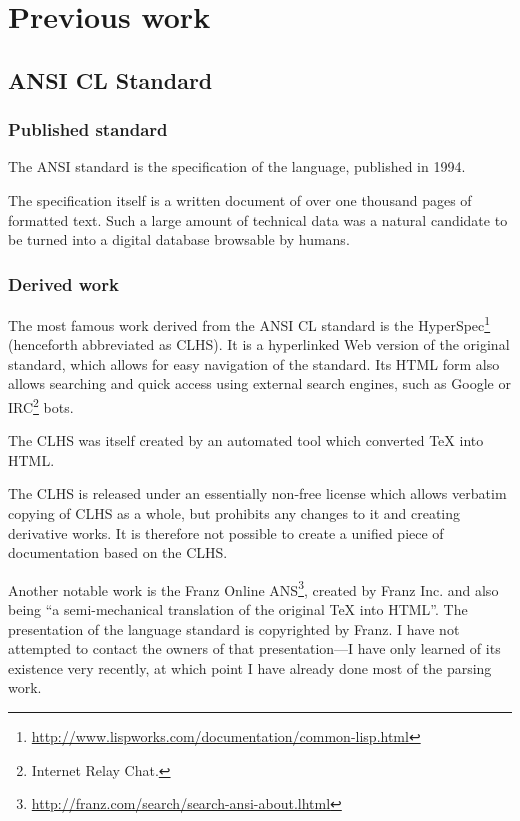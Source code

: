 \section{Previous work}

\subsection{ANSI CL Standard}

\subsubsection{Published standard}

The ANSI \cl{} standard\cite{ANSI:1994:standard} is the specification of the \cl{} language, published in 1994.

The specification itself is a written document of over one thousand pages of formatted text. Such a large amount of technical data was a natural candidate to be turned into a digital database browsable by humans.
\subsubsection{Derived work}
The most famous work derived from the ANSI CL standard is the \cl{} HyperSpec\footnote{\url{http://www.lispworks.com/documentation/common-lisp.html}} (henceforth abbreviated as CLHS). It is a hyperlinked Web version of the original standard, which allows for easy navigation of the standard. Its HTML form also allows searching and quick access using external search engines, such as Google or IRC\footnote{Internet Relay Chat.} bots.

The CLHS was itself created by an automated tool which converted TeX into HTML.

The CLHS is released under an essentially non-free license which allows verbatim copying of CLHS as a whole, but prohibits any changes to it and creating derivative works. It is therefore not possible to create a unified piece of \cl{} documentation based on the CLHS.

Another notable work is the Franz Online ANS\footnote{\url{
http://franz.com/search/search-ansi-about.lhtml}}, created by Franz Inc. and also being ``a semi-mechanical translation of the original TeX into HTML''. The presentation of the language standard is copyrighted by Franz. I have not attempted to contact the owners of that presentation---I have only learned of its existence very recently, at which point I have already done most of the parsing work.

